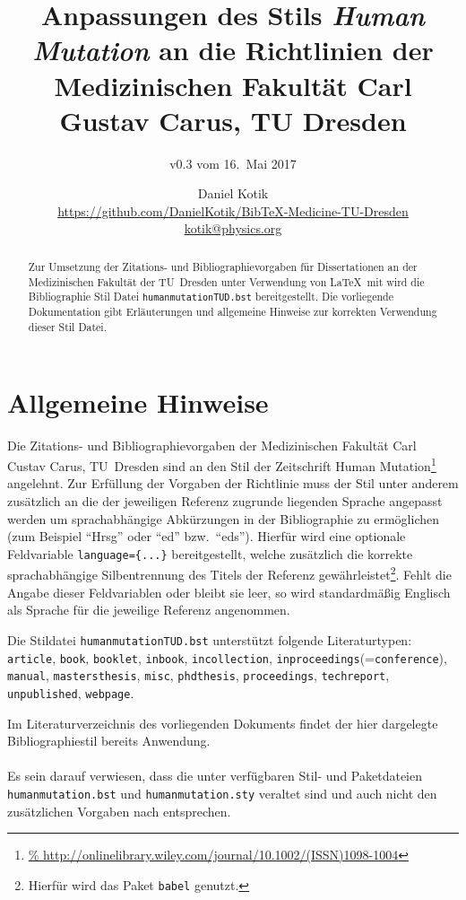 \documentclass[a4paper,10pt]{scrartcl}
\title{Anpassungen des Stils \emph{Human Mutation} an die
Richtlinien der Medizinischen Fakultät Carl Gustav Carus, TU Dresden}
\subtitle{v0.3 vom 16.~Mai 2017}
\author{Daniel Kotik\\
\large\url{https://github.com/DanielKotik/BibTeX-Medicine-TU-Dresden}\\
\large\url{kotik@physics.org}}
\date{}
\renewcommand{\cite}{\citep}  %
\begin{document}
\setlength{\parindent}{0em}
\maketitle

\begin{abstract}
Zur Umsetzung der Zitations- und Bibliographievorgaben für Dissertationen an
der Medizinischen Fakultät der TU~Dresden unter Verwendung von \LaTeX\ mit
 wird die Bibliographie Stil Datei
\verb|humanmutationTUD.bst| bereitgestellt. Die vorliegende Dokumentation gibt
Erläuterungen und allgemeine Hinweise zur korrekten Verwendung dieser Stil
Datei.
\end{abstract}

\section{Allgemeine Hinweise}
Die Zitations- und Bibliographievorgaben \cite{Bilz2013} der
Medizinischen Fakultät Carl Custav
Carus, TU~Dresden sind an den Stil der Zeitschrift Human
Mutation\footnote{\url{%
http://onlinelibrary.wiley.com/journal/10.1002/(ISSN)1098-1004}} angelehnt.
Zur Erfüllung der Vorgaben der Richtlinie muss der Stil unter anderem zusätzlich
an die der jeweiligen Referenz zugrunde liegenden Sprache angepasst werden um
sprachabhängige Abkürzungen in der Bibliographie zu ermöglichen (zum Beispiel
"`Hrsg"' oder "`ed"' bzw.\ "`eds"').
Hierfür wird eine optionale Feldvariable \verb|language={...}|
bereitgestellt, welche zusätzlich die korrekte sprachabhängige Silbentrennung
des Titels der Referenz gewährleistet\footnote{Hierfür wird das Paket
\verb|babel| genutzt.}. Fehlt die Angabe dieser Feldvariablen oder bleibt sie
leer, so wird standardmä{\ss}ig Englisch als Sprache für die jeweilige Referenz
angenommen.

Die Stildatei \verb|humanmutationTUD.bst| unterstützt folgende Literaturtypen:
\verb|article|, \verb|book|, \verb|booklet|, \verb|inbook|,
\verb|incollection|, \verb|inproceedings|(=\verb|conference|), \verb|manual|,
\verb|mastersthesis|, \verb|misc|, \verb|phdthesis|, \verb|proceedings|,
\verb|techreport|, \verb|unpublished|, \verb|webpage|.


Im Literaturverzeichnis des vorliegenden
Dokuments findet der hier
dargelegte Bibliographiestil bereits Anwendung. \\\\
Es sein darauf verwiesen, dass die unter \cite{Schneider1998}
verfügbaren Stil- und Paketdateien \verb|humanmutation.bst| und
\verb|humanmutation.sty| veraltet sind und auch nicht den zusätzlichen Vorgaben
nach \cite{Bilz2013} entsprechen.
\end{document}
